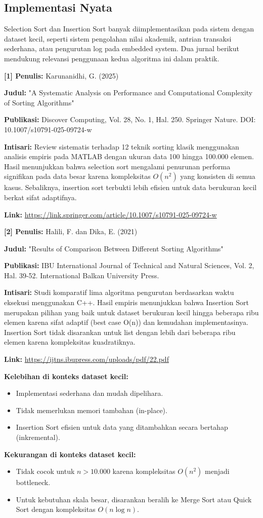 \subsection{Implementasi Nyata}
Selection Sort dan Insertion Sort banyak diimplementasikan pada sistem dengan dataset kecil, seperti sistem pengolahan nilai akademik, antrian transaksi sederhana, atau pengurutan log pada embedded system. Dua jurnal berikut mendukung relevansi penggunaan kedua algoritma ini dalam praktik.

\vspace{1em}
\textbf{[1] Penulis:} Karunanidhi, G. (2025)

\textbf{Judul:} "A Systematic Analysis on Performance and Computational Complexity of Sorting Algorithms"

\textbf{Publikasi:} Discover Computing, Vol. 28, No. 1, Hal. 250. Springer Nature. DOI: 10.1007/s10791-025-09724-w

\textbf{Intisari:} Review sistematis terhadap 12 teknik sorting klasik menggunakan analisis empiris pada MATLAB dengan ukuran data 100 hingga 100.000 elemen. Hasil menunjukkan bahwa selection sort mengalami penurunan performa signifikan pada data besar karena kompleksitas $O(n^2)$ yang konsisten di semua kasus. Sebaliknya, insertion sort terbukti lebih efisien untuk data berukuran kecil berkat sifat adaptifnya.

\textbf{Link:} \url{https://link.springer.com/article/10.1007/s10791-025-09724-w}

\vspace{1.5em}
\textbf{[2] Penulis:} Halili, F. dan Dika, E. (2021)

\textbf{Judul:} "Results of Comparison Between Different Sorting Algorithms"

\textbf{Publikasi:} IBU International Journal of Technical and Natural Sciences, Vol. 2, Hal. 39-52. International Balkan University Press.

\textbf{Intisari:} Studi komparatif lima algoritma pengurutan berdasarkan waktu eksekusi menggunakan C++. Hasil empiris menunjukkan bahwa Insertion Sort merupakan pilihan yang baik untuk dataset berukuran kecil hingga beberapa ribu elemen karena sifat adaptif (best case O(n)) dan kemudahan implementasinya. Insertion Sort tidak disarankan untuk list dengan lebih dari beberapa ribu elemen karena kompleksitas kuadratiknya.

\textbf{Link:} \url{https://ijtns.ibupress.com/uploads/pdf/22.pdf}

\vspace{1.5em}
\textbf{Kelebihan di konteks dataset kecil:}
\begin{itemize}
    \item Implementasi sederhana dan mudah dipelihara.
    \item Tidak memerlukan memori tambahan (in-place).
    \item Insertion Sort efisien untuk data yang ditambahkan secara bertahap (inkremental).
\end{itemize}

\textbf{Kekurangan di konteks dataset kecil:}
\begin{itemize}
    \item Tidak cocok untuk $n > 10.000$ karena kompleksitas $O(n^2)$ menjadi bottleneck.
    \item Untuk kebutuhan skala besar, disarankan beralih ke Merge Sort atau Quick Sort dengan kompleksitas $O(n \log n)$.
\end{itemize}
